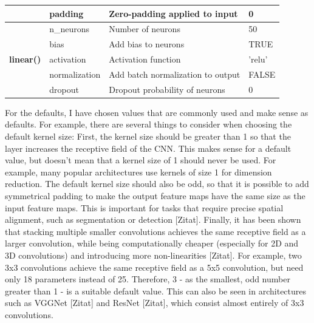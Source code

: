 \documentclass[12pt,twoside]{scrreport}
\begin{document}
\begin{table}[t]
{\begin{tabular}{|llll|}
			& padding       & Zero-padding applied to input                                     & 0         \\
			\hline
			\multirow{5}{*}{\textbf{linear()}}   & n\_neurons    & Number of neurons                                                                                              & 50        \\
			& bias          & Add bias to neurons                                                              & TRUE      \\
			& activation    & Activation function                                                      & 'relu'    \\
			& normalization & Add batch normalization to output                                                      & FALSE     \\
			& dropout       & Dropout probability of neurons                                          & 0         \\ \hline
		\end{tabular}
	}

	\label{layers}
\end{table}

For the defaults, I have chosen values that are commonly used and make sense as defaults. For example, there are several things to consider when choosing the default kernel size: First, the kernel size should be greater than 1 so that the layer increases the receptive field of the CNN. This makes sense for a default value, but doesn't mean that a kernel size of 1 should never be used. For example, many popular architectures use kernels of size 1 for dimension reduction. The default kernel size should also be odd, so that it is possible to add symmetrical padding to make the output feature maps have the same size as the input feature maps. This is important for tasks that require precise spatial alignment, such as segmentation or detection [Zitat]. Finally, it has been shown that stacking multiple smaller convolutions achieves the same receptive field as a larger convolution, while being computationally cheaper (especially for 2D and 3D convolutions) and introducing more non-linearities [Zitat]. For example, two 3x3 convolutions achieve the same receptive field as a 5x5 convolution, but need only 18 parameters instead of 25. Therefore, 3 - as the smallest, odd number greater than 1 - is a suitable default value. This can also be seen in architectures such as VGGNet [Zitat] and ResNet [Zitat], which consist almost entirely of 3x3 convolutions.
\end{document}
